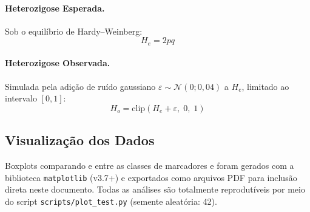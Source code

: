 \paragraph{Heterozigose Esperada.}
Sob o equilíbrio de Hardy--Weinberg:
\begin{equation}
    H_e = 2pq
    \label{eq:he}
\end{equation}

\paragraph{Heterozigose Observada.}
Simulada pela adição de ruído gaussiano $\varepsilon \sim \mathcal{N}(0; 0,04)$
a $H_e$, limitado ao intervalo $[0, 1]$:
\begin{equation}
    H_o = \text{clip}\left(H_e + \varepsilon,\; 0,\; 1\right)
    \label{eq:ho}
\end{equation}

\subsection{Visualização dos Dados}
\label{sec:viz}

Boxplots comparando \pic{} e \he{} entre as classes de marcadores \snp{} e
\ssr{} foram gerados com a biblioteca \texttt{matplotlib} (v3.7+) e exportados
como arquivos PDF para inclusão direta neste documento. Todas as análises são
totalmente reprodutíveis por meio do script \texttt{scripts/plot\_test.py}
(semente aleatória: 42).
